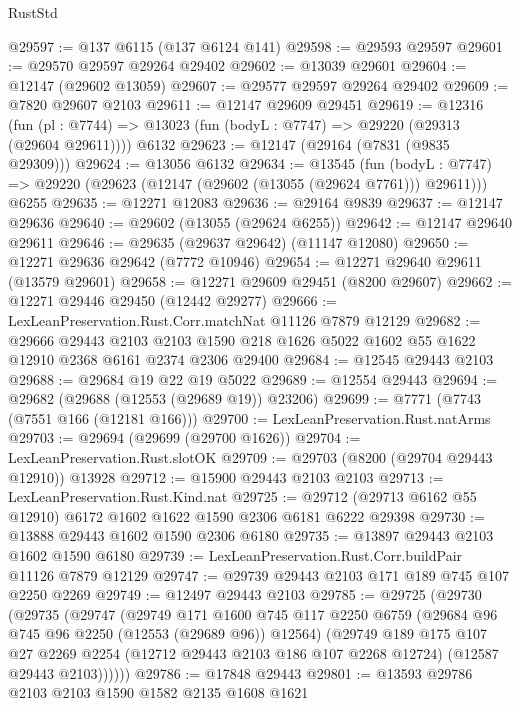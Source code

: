 \begin{lexlean}{RustStd}
\begin{coremodule}
@29597 := @137 @6115 (@137 @6124 @141)
@29598 := @29593 @29597
@29601 := @29570 @29597 @29264 @29402
@29602 := @13039 @29601
@29604 := @12147 (@29602 @13059)
@29607 := @29577 @29597 @29264 @29402
@29609 := @7820 @29607 @2103
@29611 := @12147 @29609 @29451
@29619 := @12316
    (fun (pl : @7744) => @13023 (fun (bodyL : @7747) => @29220 (@29313 (@29604 @29611))))
    @6132
@29623 := @12147 (@29164 (@7831 (@9835 @29309)))
@29624 := @13056 @6132
@29634 := @13545
    (fun (bodyL : @7747) => @29220 (@29623 (@12147 (@29602 (@13055 (@29624 @7761))) @29611)))
    @6255
@29635 := @12271 @12083
@29636 := @29164 @9839
@29637 := @12147 @29636
@29640 := @29602 (@13055 (@29624 @6255))
@29642 := @12147 @29640 @29611
@29646 := @29635 (@29637 @29642) (@11147 @12080)
@29650 := @12271 @29636 @29642 (@7772 @10946)
@29654 := @12271 @29640 @29611 (@13579 @29601)
@29658 := @12271 @29609 @29451 (@8200 @29607)
@29662 := @12271 @29446 @29450 (@12442 @29277)
@29666 := LexLeanPreservation.Rust.Corr.matchNat @11126 @7879 @12129
@29682 := @29666
    @29443
    @2103
    @2103
    @1590
    @218
    @1626
    @5022
    @1602
    @55
    @1622
    @12910
    @2368
    @6161
    @2374
    @2306
    @29400
@29684 := @12545 @29443 @2103
@29688 := @29684 @19 @22 @19 @5022
@29689 := @12554 @29443
@29694 := @29682 (@29688 (@12553 (@29689 @19)) @23206)
@29699 := @7771 (@7743 (@7551 @166 (@12181 @166)))
@29700 := LexLeanPreservation.Rust.natArms
@29703 := @29694 (@29699 (@29700 @1626))
@29704 := LexLeanPreservation.Rust.slotOK
@29709 := @29703 (@8200 (@29704 @29443 @12910)) @13928
@29712 := @15900 @29443 @2103 @2103
@29713 := LexLeanPreservation.Rust.Kind.nat
@29725 := @29712 (@29713 @6162 @55 @12910) @6172 @1602 @1622 @1590 @2306 @6181 @6222 @29398
@29730 := @13888 @29443 @1602 @1590 @2306 @6180
@29735 := @13897 @29443 @2103 @1602 @1590 @6180
@29739 := LexLeanPreservation.Rust.Corr.buildPair @11126 @7879 @12129
@29747 := @29739 @29443 @2103 @171 @189 @745 @107 @2250 @2269
@29749 := @12497 @29443 @2103
@29785 := @29725
    (@29730
      (@29735
        (@29747
          (@29749
            @171
            @1600
            @745
            @117
            @2250
            @6759
            (@29684 @96 @745 @96 @2250 (@12553 (@29689 @96)) @12564)
            (@29749
              @189
              @175
              @107
              @27
              @2269
              @2254
              (@12712 @29443 @2103 @186 @107 @2268 @12724)
              (@12587 @29443 @2103))))))
@29786 := @17848 @29443
@29801 := @13593
    @29786
    @2103
    @2103
    @1590
    @1582
    @2135
    @1608
    @1621

\end{coremodule}
\end{lexlean}
